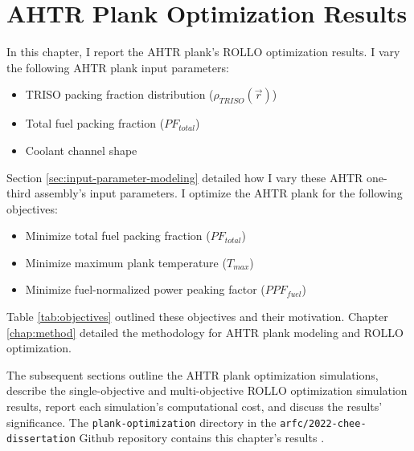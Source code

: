 \chapter{AHTR Plank Optimization Results}
\glsresetall
\label{chap:ahtr-plank-opt-results}
In this chapter, I report the \gls{AHTR} plank's \gls{ROLLO} optimization results. 
I vary the following \gls{AHTR} plank input parameters:
\begin{itemize}
    \item \gls{TRISO} packing fraction distribution ($\rho_{TRISO}(\vec{r})$)
    \item Total fuel packing fraction ($PF_{total}$)
    \item Coolant channel shape
\end{itemize} 
Section \ref{sec:input-parameter-modeling} detailed how I vary these 
\gls{AHTR} one-third assembly's input parameters. 
I optimize the \gls{AHTR} plank for the following objectives:
\begin{itemize}
    \item Minimize total fuel packing fraction ($PF_{total}$)
    \item Minimize maximum plank temperature ($T_{max}$)
    \item Minimize fuel-normalized power peaking factor ($PPF_{fuel}$)
\end{itemize} 
Table \ref{tab:objectives} outlined these objectives and their motivation.
Chapter \ref{chap:method} detailed the methodology for \gls{AHTR} plank modeling 
and \gls{ROLLO} optimization. 

The subsequent sections outline the \gls{AHTR} plank optimization simulations, 
describe the single-objective and multi-objective \gls{ROLLO} optimization simulation 
results, report each simulation's computational cost, and discuss the 
results' significance.
The \texttt{plank-optimization} directory in the \texttt{arfc/2022-chee-dissertation} 
Github repository contains this chapter's results \cite{chee_dissertation_2021}. 

